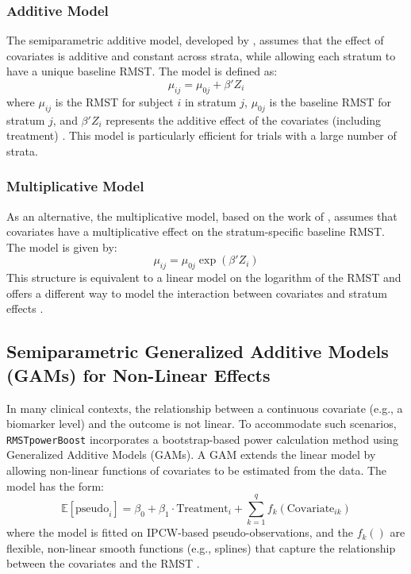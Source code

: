 \documentclass[article]{jss}
\begin{document}
\subsubsection{Additive Model}
The semiparametric additive model, developed by \citet{zhang2024}, assumes that the effect of covariates is additive and constant across strata, while allowing each stratum to have a unique baseline RMST. The model is defined as:
\begin{equation}
\mu_{ij} = \mu_{0j} + \beta'Z_i
\end{equation}
where $\mu_{ij}$ is the RMST for subject $i$ in stratum $j$, $\mu_{0j}$ is the baseline RMST for stratum $j$, and $\beta'Z_i$ represents the additive effect of the covariates (including treatment) \cite{[1]}. This model is particularly efficient for trials with a large number of strata.

\subsubsection{Multiplicative Model}
As an alternative, the multiplicative model, based on the work of \citet{wang2019}, assumes that covariates have a multiplicative effect on the stratum-specific baseline RMST. The model is given by:
\begin{equation}
\mu_{ij} = \mu_{0j} \exp(\beta'Z_i)
\end{equation}
This structure is equivalent to a linear model on the logarithm of the RMST and offers a different way to model the interaction between covariates and stratum effects \cite{[1]}.

\subsection{Semiparametric Generalized Additive Models (GAMs) for Non-Linear Effects}
In many clinical contexts, the relationship between a continuous covariate (e.g., a biomarker level) and the outcome is not linear. To accommodate such scenarios, \texttt{RMSTpowerBoost} incorporates a bootstrap-based power calculation method using Generalized Additive Models (GAMs). A GAM extends the linear model by allowing non-linear functions of covariates to be estimated from the data. The model has the form:
\begin{equation}
\mathbb{E}[\text{pseudo}_i] = \beta_0 + \beta_1 \cdot \text{Treatment}_i + \sum_{k=1}^{q} f_k(\text{Covariate}_{ik})
\end{equation}
where the model is fitted on IPCW-based pseudo-observations, and the $f_k()$ are flexible, non-linear smooth functions (e.g., splines) that capture the relationship between the covariates and the RMST \cite{[1]}.
\end{document}
